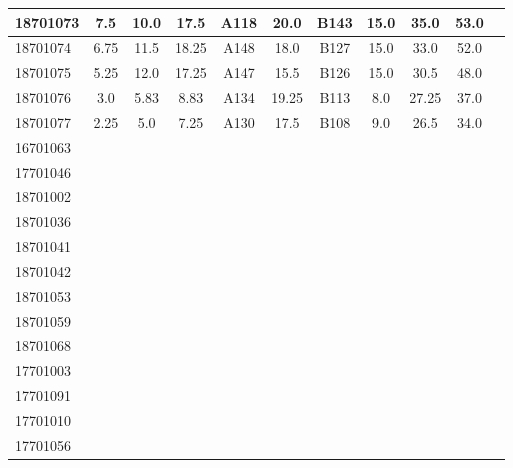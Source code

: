 \documentclass[12pt]{article}
\begin{document}
\begin{center}
\begin{small}
\begin{tabular}{|l|c|c|c|c|c|c|c|c|c|c|}
18701073 & 7.5 & 10.0 & 17.5 & A118 & 20.0 & B143 & 15.0 & 35.0 & 53.0\\ \hline 
18701074 & 6.75 & 11.5 & 18.25 & A148 & 18.0 & B127 & 15.0 & 33.0 & 52.0\\ \hline 
18701075 & 5.25 & 12.0 & 17.25 & A147 & 15.5 & B126 & 15.0 & 30.5 & 48.0\\ \hline 
18701076 & 3.0 & 5.83 & 8.83 & A134 & 19.25 & B113 & 8.0 & 27.25 & 37.0\\ \hline 
18701077 & 2.25 & 5.0 & 7.25 & A130 & 17.5 & B108 & 9.0 & 26.5 & 34.0\\ \hline 
16701063 &  &  &  &  &  &  &  &  & \\ \hline 
17701046 &  &  &  &  &  &  &  &  & \\ \hline 
18701002 &  &  &  &  &  &  &  &  & \\ \hline 
18701036 &  &  &  &  &  &  &  &  & \\ \hline 
18701041 &  &  &  &  &  &  &  &  & \\ \hline 
18701042 &  &  &  &  &  &  &  &  & \\ \hline 
18701053 &  &  &  &  &  &  &  &  & \\ \hline 
18701059 &  &  &  &  &  &  &  &  & \\ \hline 
18701068 &  &  &  &  &  &  &  &  & \\ \hline 
17701003 &  &  &  &  &  &  &  &  & \\ \hline 
17701091 &  &  &  &  &  &  &  &  & \\ \hline 
17701010 &  &  &  &  &  &  &  &  & \\ \hline 
17701056 &  &  &  &  &  &  &  &  & \\ \hline 
        \end{tabular}
            \end{small}
            \end{center}
  \centering
            
\end{document}
